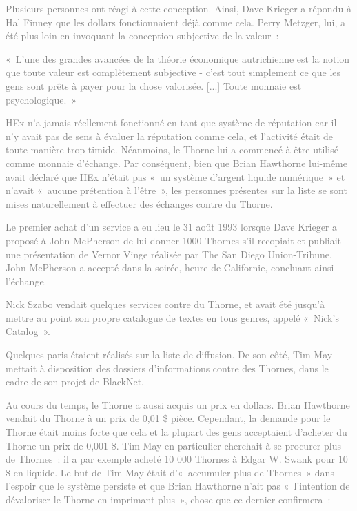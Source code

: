 \textcolor{gray}{Plusieurs personnes ont réagi à cette conception. Ainsi, Dave Krieger a répondu à Hal Finney que les dollars fonctionnaient déjà comme cela. Perry Metzger, lui, a été plus loin en invoquant la conception subjective de la valeur~:}

\textcolor{gray}{«~L'une des grandes avancées de la théorie économique autrichienne est la notion que toute valeur est complètement subjective - c'est tout simplement ce que les gens sont prêts à payer pour la chose valorisée. [...] Toute monnaie est psychologique.~»}

\textcolor{gray}{HEx n'a jamais réellement fonctionné en tant que système de réputation car il n'y avait pas de sens à évaluer la réputation comme cela, et l'activité était de toute manière trop timide. Néanmoins, le Thorne lui a commencé à être utilisé comme monnaie d'échange. Par conséquent, bien que Brian Hawthorne lui-même avait déclaré que HEx n'était pas «~un système d'argent liquide numérique~» et n'avait «~aucune prétention à l'être~», les personnes présentes sur la liste se sont mises naturellement à effectuer des échanges contre du Thorne.}

\textcolor{gray}{Le premier achat d'un service a eu lieu le 31 août 1993 lorsque Dave Krieger a proposé à John McPherson de lui donner 1000 Thornes s'il recopiait et publiait une présentation de Vernor Vinge réalisée par The San Diego Union-Tribune. John McPherson a accepté dans la soirée, heure de Californie, concluant ainsi l'échange.}

\textcolor{gray}{Nick Szabo vendait quelques services contre du Thorne, et avait été jusqu'à mettre au point son propre catalogue de textes en tous genres, appelé «~Nick's Catalog~».}

\textcolor{gray}{Quelques paris étaient réalisés sur la liste de diffusion. De son côté, Tim May mettait à disposition des dossiers d'informations contre des Thornes, dans le cadre de son projet de BlackNet.}

\textcolor{gray}{Au cours du temps, le Thorne a aussi acquis un prix en dollars. Brian Hawthorne vendait du Thorne à un prix de 0,01 \$ pièce. Cependant, la demande pour le Thorne était moins forte que cela et la plupart des gens acceptaient d'acheter du Thorne un prix de 0,001 \$. Tim May en particulier cherchait à se procurer plus de Thornes~: il a par exemple acheté 10 000 Thornes à Edgar W. Swank pour 10 \$ en liquide. Le but de Tim May était d'«~accumuler plus de Thornes~» dans l'espoir que le système persiste et que Brian Hawthorne n'ait pas «~l'intention de dévaloriser le Thorne en imprimant plus~», chose que ce dernier confirmera~:}

